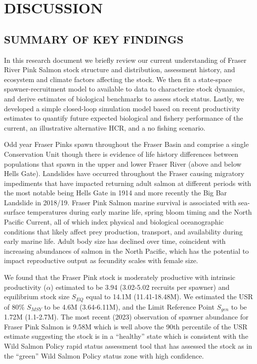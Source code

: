 \documentclass[11pt]{book}
\begin{document}
\hypertarget{discussion}{%
\section{DISCUSSION}\label{discussion}}

\hypertarget{summary-of-key-findings}{%
\subsection{SUMMARY OF KEY FINDINGS}\label{summary-of-key-findings}}

In this research document we briefly review our current understanding of Fraser River Pink Salmon stock structure and distribution, assessment history, and ecosystem and climate factors affecting the stock. We then fit a state-space spawner-recruitment model to available to data to characterize stock dynamics, and derive estimates of biological benchmarks to assess stock status. Lastly, we developed a simple closed-loop simulation model based on recent productivity estimates to quantify future expected biological and fishery performance of the current, an illustrative alternative HCR, and a no fishing scenario.

Odd year Fraser Pinks spawn throughout the Fraser Basin and comprise a single Conservation Unit though there is evidence of life history differences between populations that spawn in the upper and lower Fraser River (above and below Hells Gate). Landslides have occurred throughout the Fraser causing migratory impediments that have impacted returning adult salmon at different periods with the most notable being Hells Gate in 1914 and more recently the Big Bar Landslide in 2018/19. Fraser Pink Salmon marine survival is associated with sea-surface temperatures during early marine life, spring bloom timing and the North Pacific Current, all of which index physical and biological oceanographic conditions that likely affect prey production, transport, and availability during early marine life. Adult body size has declined over time, coincident with increasing abundances of salmon in the North Pacific, which has the potential to impact reproductive output as fecundity scales with female size.

We found that the Fraser Pink stock is moderately productive with intrinsic productivity (\(\alpha\)) estimated to be 3.94 (3.02-5.02 recruits per spawner) and equilibrium stock size \(S_{EQ}\) equal to 14.1M (11.41-18.48M). We estimated the USR of 80\% \(S_{MSY}\) to be 4.6M (3.64-6.11M), and the Limit Reference Point \(S_{gen}\) to be 1.72M (1.1-2.7M). The most recent (2023) observation of spawner abundance for Fraser Pink Salmon is 9.58M which is well above the 90th percentile of the USR estimate suggesting the stock is in a ``healthy'' state which is consistent with the Wild Salmon Policy rapid status assessment tool that has assessed the stock as in the ``green'' Wild Salmon Policy status zone with high confidence.
\end{document}
